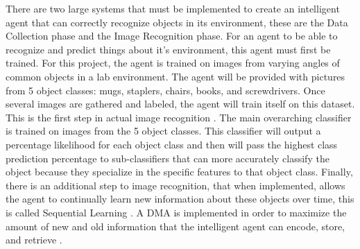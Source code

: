 \documentclass[draftclsnofoot, onecolumn, 10pt, compsoc]{IEEEtran}
\begin{document}
		There are two large systems that must be implemented to create an intelligent agent that can correctly recognize objects in its environment, these are the Data Collection phase and the Image Recognition phase. For an agent to be able to recognize and predict things about it's environment, this agent must first be trained. For this project, the agent is trained on images from varying angles of common objects in a lab environment. The agent will be provided with pictures from 5 object classes: mugs, staplers, chairs, books, and screwdrivers. Once several images are gathered and labeled, the agent will train itself on this dataset. This is the first step in actual image recognition \cite{ImgRecog}. The main overarching classifier is trained on images from the 5 object classes. This classifier will output a percentage likelihood for each object class and then will pass the highest class prediction percentage to sub-classifiers that can more accurately classify the object because they specialize in the specific features to that object class. Finally, there is an additional step to image recognition, that when implemented, allows the agent to continually learn new information about these objects over time, this is called Sequential Learning \cite{Kirkpatrick}. A DMA is implemented in order to maximize the amount of new and old information that the intelligent agent can encode, store, and retrieve \cite{McDermott}.

	
	
\end{document}
